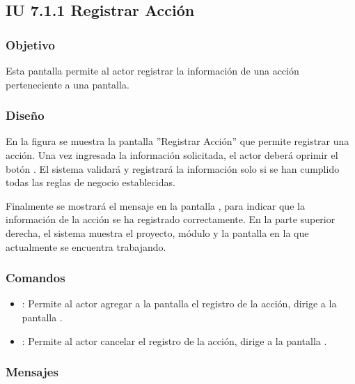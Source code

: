 \subsection{IU 7.1.1 Registrar Acción}

\subsubsection{Objetivo}
	Esta pantalla permite al actor registrar la información de una acción perteneciente a una pantalla.
\subsubsection{Diseño}
	En la figura  se muestra la pantalla ''Registrar Acción'' que permite registrar una acción.
	Una vez ingresada la información solicitada, el actor deberá oprimir el botón  . El sistema validará y registrará la información solo si se han cumplido todas las reglas de negocio establecidas.
	
	Finalmente se mostrará el mensaje  en la pantalla , para indicar que la información de la acción se ha registrado correctamente.
	En la parte superior derecha, el sistema muestra el proyecto, módulo y la pantalla en la que actualmente se encuentra trabajando.

\subsubsection{Comandos}
\begin{itemize}
	\item {}: Permite al actor agregar a la pantalla el registro de la acción, dirige a la pantalla .
	\item {}: Permite al actor cancelar el registro de la acción, dirige a la pantalla .
\end{itemize}

\subsubsection{Mensajes}

